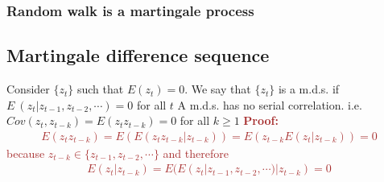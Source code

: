 \documentclass[a4paper,twoside,11pt]{article}
\begin{document}
\subsubsection{Random walk is a martingale process}
\begin{center}
\end{center}
\subsection{Martingale difference sequence}
Consider $\{ z_t \}$ such that $E(z_t) = 0$. We say that $\{ z_t \}$ is a m.d.s.  if $E  \ (z_t | z_{t-1}, z_{t-2}, \cdots) =0  $ for all $t$ 
\newline
\newline
A m.d.s. has no serial correlation. i.e. $Cov(z_t, z_{t-k}) = E(z_t z_{t-k}) = 0$ for all $k \ge 1$ 
\newline
\newline
\textcolor{Brown}{
\textbf{Proof:}
\begin{equation*}
\begin{aligned}
E(z_t z_{t-k}) = E(E(z_t z_{t-k}|z_{t-k})) = E(z_{t-k} E(z_t | z_{t-k})) = 0 
\end{aligned}
\end{equation*}
because $z_{t-k} \in \{ z_{t-1} , z_{t-2} ,\cdots \}$ and therefore
\begin{equation*}
\begin{aligned}
E(z_t | z_{t-k}) = E(E(z_t|z_{t-1}, z_{t-2}, \cdots ) |z_{t-k}) = 0
\end{aligned}
\end{equation*}}
\end{document}
